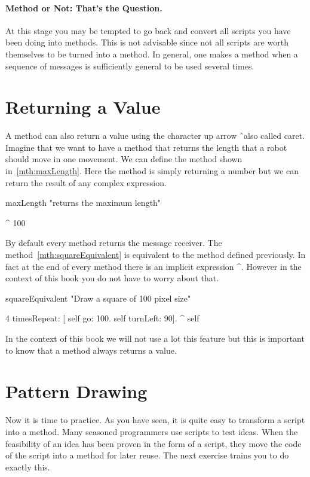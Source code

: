 \paragraph{Method or Not: That's the Question.} At this stage you may be tempted to go back and convert all scripts you have been doing into methods. This is not advisable since not all scripts are worth themselves to be turned into a method. In general, one makes a method when a sequence of messages is sufficiently general to be used several times.

\section{Returning a Value}
A method can also return a value using the character up arrow \^\ also called    caret. Imagine that we want to have a method that returns the length that a robot should move in one movement. We can define the method  shown in~\ref{mth:maxLength}. Here the method is simply returning a number but we can return the result of any complex expression. 

\begin{method}\label{mth:maxLength}
maxLength 
   "returns the maximum length"

   ^ 100
\end{method}

By default every method returns the message receiver. The method~\ref{mth:squareEquivalent} is equivalent to the method  defined previously. In fact at the end of every method there is an implicit expression \^ \self. However in the context of this book you do not have to worry about that. 

\begin{method}\label{mth:squareEquivalent}
squareEquivalent
   "Draw a square of 100 pixel size"

   4 timesRepeat: 
              [ self go: 100.
              self turnLeft: 90].
   ^ self
\end{method}

In the context of this book we will not use a lot this feature but this is important to know that a method always returns a value. 

\section{Pattern Drawing}\label{sec:newart}
Now it is time to practice. As you have seen, it is quite easy to transform a script into a method.  Many seasoned programmers use scripts to test ideas. When the feasibility of an idea has been proven in the form of a script, they move the code of the script into a method for later reuse. The next exercise trains you to do exactly this.

